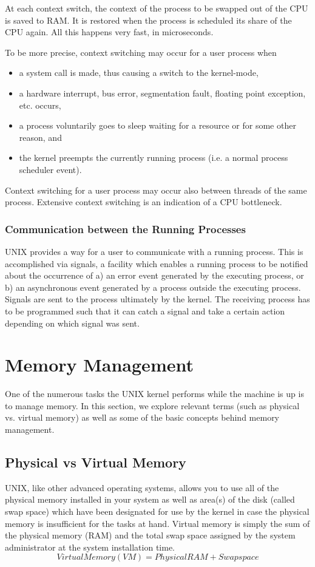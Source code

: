 \documentclass{article}
\begin{document}
At each context switch, the context of the process to be swapped out of the CPU is
saved to RAM. It is restored when the process is scheduled its share of the CPU again.
All this happens very fast, in microseconds.

To be more precise, context switching may occur for a user process when

\begin{itemize}
    \item a system call is made, thus causing a switch to the kernel-mode,
    \item a hardware interrupt, bus error, segmentation fault, floating point exception, etc. occurs,
    \item a process voluntarily goes to sleep waiting for a resource or for some other
    reason, and
    \item the kernel preempts the currently running process (i.e. a normal process scheduler event).
\end{itemize}
Context switching for a user process may occur also between threads of the same process. Extensive context switching is an indication of a CPU bottleneck.

\subsubsection{Communication between the Running Processes}
UNIX provides a way for a user to communicate with a running process. This is
accomplished via signals, a facility which enables a running process to be notified
about the occurrence of a) an error event generated by the executing process, or b) an
asynchronous event generated by a process outside the executing process.
Signals are sent to the process ultimately by the kernel. The receiving process has to
be programmed such that it can catch a signal and take a certain action depending on
which signal was sent.


\section{Memory Management}
One of the numerous tasks the UNIX kernel performs while the machine is up is to
manage memory. In this section, we explore relevant terms (such as physical vs.
virtual memory) as well as some of the basic concepts behind memory management.

\subsection{Physical vs Virtual Memory}
UNIX, like other advanced operating systems, allows you to use all of the physical
memory installed in your system as well as area(s) of the disk (called swap space)
which have been designated for use by the kernel in case the physical memory is
insufficient for the tasks at hand. Virtual memory is simply the sum of the physical
memory (RAM) and the total swap space assigned by the system administrator at the
system installation time.
\[
Virtual Memory (VM) = Physical RAM + Swap space
\]
\end{document}
